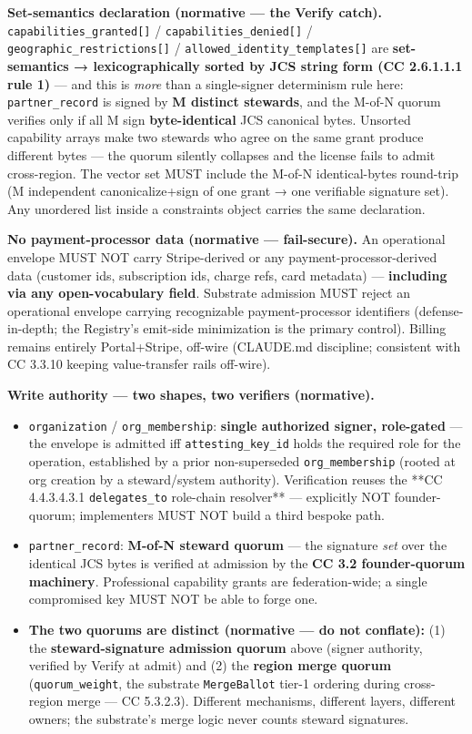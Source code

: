 \documentclass[11pt]{article}
\begin{document}
\textbf{Set-semantics declaration (normative — the Verify catch).} \texttt{capabilities\_granted[]} / \texttt{capabilities\_denied[]} / \texttt{geographic\_restrictions[]} / \texttt{allowed\_identity\_templates[]} are \textbf{set-semantics → lexicographically sorted by JCS string form (CC 2.6.1.1.1 rule 1)} — and this is \textit{more} than a single-signer determinism rule here: \texttt{partner\_record} is signed by \textbf{M distinct stewards}, and the M-of-N quorum verifies only if all M sign \textbf{byte-identical} JCS canonical bytes. Unsorted capability arrays make two stewards who agree on the same grant produce different bytes — the quorum silently collapses and the license fails to admit cross-region. The vector set MUST include the M-of-N identical-bytes round-trip (M independent canonicalize+sign of one grant → one verifiable signature set). Any unordered list inside a constraints object carries the same declaration.


\textbf{No payment-processor data (normative — fail-secure).} An operational envelope MUST NOT carry Stripe-derived or any payment-processor-derived data (customer ids, subscription ids, charge refs, card metadata) — \textbf{including via any open-vocabulary field}. Substrate admission MUST reject an operational envelope carrying recognizable payment-processor identifiers (defense-in-depth; the Registry's emit-side minimization is the primary control). Billing remains entirely Portal+Stripe, off-wire (CLAUDE.md discipline; consistent with CC 3.3.10 keeping value-transfer rails off-wire).


\textbf{Write authority — two shapes, two verifiers (normative).}

\begin{itemize}\setlength\itemsep{0pt}
\item \texttt{organization} / \texttt{org\_membership}: \textbf{single authorized signer, role-gated} — the envelope is admitted iff \texttt{attesting\_key\_id} holds the required role for the operation, established by a prior non-superseded \texttt{org\_membership} (rooted at org creation by a steward/system authority). Verification reuses the **CC 4.4.3.4.3.1 \texttt{delegates\_to} role-chain resolver** — explicitly NOT founder-quorum; implementers MUST NOT build a third bespoke path.
\item \texttt{partner\_record}: \textbf{M-of-N steward quorum} — the signature \textit{set} over the identical JCS bytes is verified at admission by the \textbf{CC 3.2 founder-quorum machinery}. Professional capability grants are federation-wide; a single compromised key MUST NOT be able to forge one.
\item \textbf{The two quorums are distinct (normative — do not conflate):} (1) the \textbf{steward-signature admission quorum} above (signer authority, verified by Verify at admit) and (2) the \textbf{region merge quorum} (\texttt{quorum\_weight}, the substrate \texttt{MergeBallot} tier-1 ordering during cross-region merge — CC 5.3.2.3). Different mechanisms, different layers, different owners; the substrate's merge logic never counts steward signatures.
\end{itemize}
\end{document}
